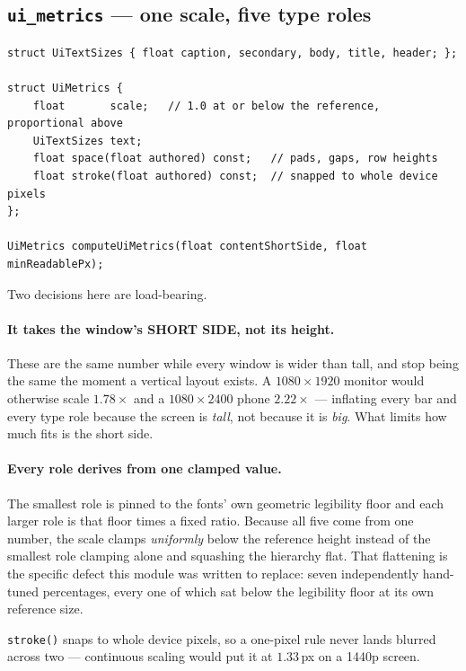 \documentclass[11pt,a4paper]{article}
\begin{document}
\subsection{\texttt{ui\_metrics} --- one scale, five type roles}

\begin{lstlisting}
struct UiTextSizes { float caption, secondary, body, title, header; };

struct UiMetrics {
    float       scale;   // 1.0 at or below the reference, proportional above
    UiTextSizes text;
    float space(float authored) const;   // pads, gaps, row heights
    float stroke(float authored) const;  // snapped to whole device pixels
};

UiMetrics computeUiMetrics(float contentShortSide, float minReadablePx);
\end{lstlisting}

Two decisions here are load-bearing.

\paragraph{It takes the window's SHORT SIDE, not its height.} These are the same
number while every window is wider than tall, and stop being the same the moment
a vertical layout exists. A $1080\times1920$ monitor would otherwise scale
$1.78\times$ and a $1080\times2400$ phone $2.22\times$ --- inflating every bar
and every type role because the screen is \emph{tall}, not because it is
\emph{big}. What limits how much fits is the short side.

\paragraph{Every role derives from one clamped value.} The smallest role is
pinned to the fonts' own geometric legibility floor and each larger role is that
floor times a fixed ratio. Because all five come from one number, the scale
clamps \emph{uniformly} below the reference height instead of the smallest role
clamping alone and squashing the hierarchy flat. That flattening is the specific
defect this module was written to replace: seven independently hand-tuned
percentages, every one of which sat below the legibility floor at its own
reference size.

\texttt{stroke()} snaps to whole device pixels, so a one-pixel rule never lands
blurred across two --- continuous scaling would put it at $1.33$\,px on a 1440p
screen.
\end{document}
